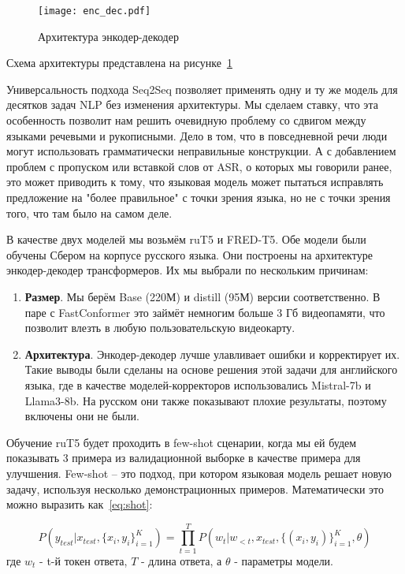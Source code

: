 \begin{figure}[!t]
  \centering
  \texttt{[image: enc\_dec.pdf]}
  \caption{Архитектура энкодер-декодер}
  \label{fig:enc_dec}
\end{figure}

Схема архитектуры представлена на рисунке~\ref{fig:enc_dec}

Универсальность подхода Seq2Seq позволяет применять одну и ту же модель для десятков задач NLP без изменения архитектуры.
Мы сделаем ставку, что эта особенность позволит нам решить очевидную проблему со сдвигом между языками речевыми и рукописными.
Дело в том, что в повседневной речи люди могут использовать грамматически неправильные конструкции.
А с добавлением проблем с пропуском или вставкой слов от ASR, о которых мы говорили ранее, это может приводить к тому, что языковая модель может пытаться исправлять предложение на "более правильное" с точки зрения языка, но не с точки зрения того, что там было на самом деле.

В качестве двух моделей мы возьмём ruT5 и FRED-T5\cite{zmitrovich2023family}.
Обе модели были обучены Сбером на корпусе русского языка.
Они построены на архитектуре энкодер-декодер трансформеров.
Их мы выбрали по нескольким причинам:

\begin{enumerate}
  \item \textbf{Размер}.
  Мы берём Base (220М) и distill (95М) версии соответственно. 
  В паре с FastConformer это займёт немногим больше 3 Гб видеопамяти, что позволит влезть в любую пользовательскую видеокарту.
  \item \textbf{Архитектура}.
  Энкодер-декодер лучше улавливает ошибки и корректирует их.
  Такие выводы были сделаны на основе решения этой задачи для английского языка\cite{iudinenhancing}, где в качестве моделей-корректоров использовались Mistral-7b и Llama3-8b\cite{grattafiori2024llama}.
  На русском они также показывают плохие результаты, поэтому включены они не были.
\end{enumerate}

Обучение ruT5 будет проходить в few-shot сценарии, когда мы ей будем показывать 3 примера из валидационной выборке в качестве примера для улучшения.
Few-shot -- это подход, при котором языковая модель решает новую задачу, используя несколько демонстрационных примеров.
Математически это можно выразить как~\ref{eq:shot}:

\begin{equation}
  P(y_{test}|x_{test},\{x_i,y_i\}^K_{i=1}) = \prod_{t=1}^{T}P(w_t|w_{<t},x_{test},\{(x_i,y_i)\}^K_{i=1},\theta)
  \label{eq:shot}
\end{equation}
где $w_t$ - t-й токен ответа, $T$ - длина ответа, а $\theta$ - параметры модели.

